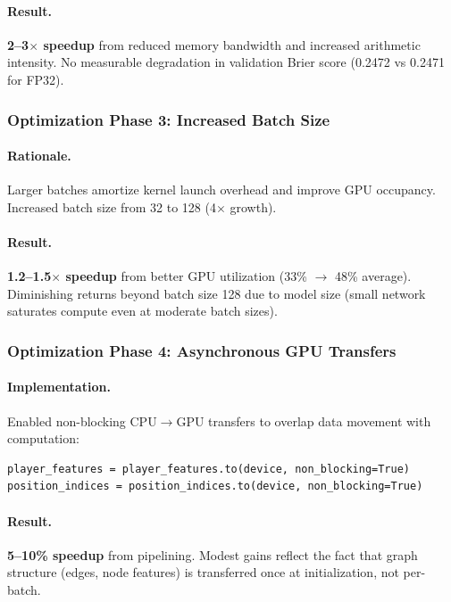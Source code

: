 \paragraph{Result.} \textbf{2--3$\times$ speedup} from reduced memory bandwidth and increased arithmetic intensity. No measurable degradation in validation Brier score (0.2472 vs 0.2471 for FP32).

\subsubsection{Optimization Phase 3: Increased Batch Size}

\paragraph{Rationale.} Larger batches amortize kernel launch overhead and improve GPU occupancy. Increased batch size from 32 to 128 (4$\times$ growth).

\paragraph{Result.} \textbf{1.2--1.5$\times$ speedup} from better GPU utilization (33\% $\to$ 48\% average). Diminishing returns beyond batch size 128 due to model size (small network saturates compute even at moderate batch sizes).

\subsubsection{Optimization Phase 4: Asynchronous GPU Transfers}

\paragraph{Implementation.} Enabled non-blocking CPU$\to$GPU transfers to overlap data movement with computation:
\begin{verbatim}
player_features = player_features.to(device, non_blocking=True)
position_indices = position_indices.to(device, non_blocking=True)
\end{verbatim}

\paragraph{Result.} \textbf{5--10\% speedup} from pipelining. Modest gains reflect the fact that graph structure (edges, node features) is transferred once at initialization, not per-batch.

